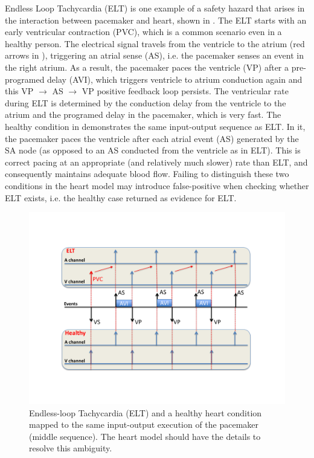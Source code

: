 Endless Loop Tachycardia (ELT) is one example of a safety hazard that arises in the interaction between pacemaker and heart, shown in .
The ELT starts with an early ventricular contraction (PVC), which is a common scenario even in a healthy person. 
The electrical signal travels from the ventricle to the atrium (red arrows in ), triggering an atrial sense (AS), i.e. the pacemaker senses an event in the right atrium. 
As a result, the pacemaker paces the ventricle (VP) after a pre-programed delay (AVI), which triggers ventricle to atrium conduction again and this VP $\rightarrow$ AS $\rightarrow$ VP positive feedback loop persists. 
The ventricular rate during ELT is determined by the conduction delay from the ventricle to the atrium and the programed delay in the pacemaker, which is very fast.
The healthy condition in  demonstrates the same input-output sequence as ELT. 
In it, the pacemaker paces the ventricle after each atrial event (AS) generated by the SA node (as opposed to an AS conducted from the ventricle as in ELT).
This is correct pacing at an appropriate (and relatively much slower) rate than ELT, and consequently maintains adequate blood flow. 
Failing to distinguish these two conditions in the heart model may introduce false-positive when checking whether ELT exists, i.e. the healthy case returned as evidence for ELT.

\begin{figure}[t]
	\centering
	\includegraphics[width=\textwidth]{figs/ambiguity.pdf}
	\caption{\small Endless-loop Tachycardia (ELT) and a healthy heart condition mapped to the same input-output execution of the pacemaker (middle sequence). The heart model should have the details to resolve this ambiguity.}
	\label{fig:ambiguity}
\end{figure}



